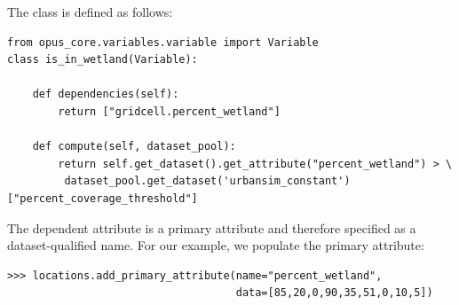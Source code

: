 The class is defined as follows:

\begin{verbatim}
from opus_core.variables.variable import Variable
class is_in_wetland(Variable):

    def dependencies(self):
        return ["gridcell.percent_wetland"]

    def compute(self, dataset_pool):
        return self.get_dataset().get_attribute("percent_wetland") > \
         dataset_pool.get_dataset('urbansim_constant')["percent_coverage_threshold"]

\end{verbatim}
The dependent attribute is a primary attribute and therefore specified as
a dataset-qualified name.  For our example, we populate the primary attribute:
\begin{verbatim}
>>> locations.add_primary_attribute(name="percent_wetland",
                                    data=[85,20,0,90,35,51,0,10,5])
\end{verbatim}

